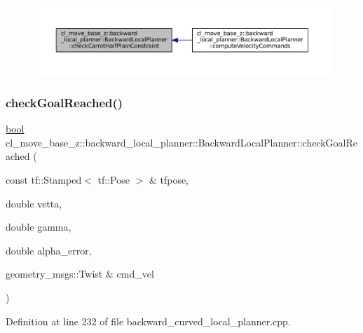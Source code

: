 \nopagebreak
\begin{figure}[H]
\begin{center}
\leavevmode
\includegraphics[width=350pt]{classcl__move__base__z_1_1backward__local__planner_1_1BackwardLocalPlanner_a22938e354a4ec489101295ed7f2539f6_icgraph}
\end{center}
\end{figure}
\mbox{\label{classcl__move__base__z_1_1backward__local__planner_1_1BackwardLocalPlanner_a6c4363e82119a6a8a5a3bfe309280898}} 
\subsubsection{\texorpdfstring{check\+Goal\+Reached()}{checkGoalReached()}}
{\footnotesize\ttfamily \hyperlink{classbool}{bool} cl\+\_\+move\+\_\+base\+\_\+z\+::backward\+\_\+local\+\_\+planner\+::\+Backward\+Local\+Planner\+::check\+Goal\+Reached (\begin{DoxyParamCaption}\item[{const tf\+::\+Stamped$<$ tf\+::\+Pose $>$ \&}]{tfpose,  }\item[{double}]{vetta,  }\item[{double}]{gamma,  }\item[{double}]{alpha\+\_\+error,  }\item[{geometry\+\_\+msgs\+::\+Twist \&}]{cmd\+\_\+vel }\end{DoxyParamCaption})\hspace{0.3cm}{\ttfamily [private]}}



Definition at line 232 of file backward\+\_\+curved\+\_\+local\+\_\+planner.\+cpp.




